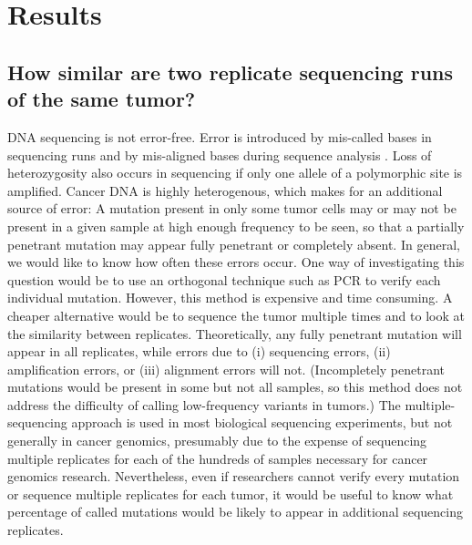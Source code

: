 \documentclass[11pt]{article} %
\begin{document}
\section*{Results}

\subsection*{How similar are two replicate sequencing runs of the same tumor?}

%

DNA sequencing is not error-free. Error is introduced by mis-called bases in sequencing runs and by mis-aligned bases during sequence analysis \citep{seqerror}. Loss of heterozygosity also occurs in sequencing if only one allele of a polymorphic site is amplified. Cancer DNA is highly heterogenous, which makes for an additional source of error: A mutation present in only some tumor cells may or may not be present in a given sample at high enough frequency to be seen, so that a partially penetrant mutation may appear fully penetrant or completely absent. In general, we would like to know how often these errors occur. One way of investigating this question would be to use an orthogonal technique such as PCR to verify each individual mutation. However, this method is expensive and time consuming. A cheaper alternative would be to sequence the tumor multiple times and to look at the similarity between replicates. Theoretically, any fully penetrant mutation will appear in all replicates, while errors due to (i) sequencing errors, (ii) amplification errors, or (iii) alignment errors will not. (Incompletely penetrant mutations would be present in some but not all samples, so this method does not address the difficulty of calling low-frequency variants in tumors.) The multiple-sequencing approach is used in most biological sequencing experiments, but not generally in cancer genomics, presumably due to the expense of sequencing multiple replicates for each of the hundreds of samples necessary for cancer genomics research. Nevertheless, even if researchers cannot verify every mutation or sequence multiple replicates for each tumor, it would be useful to know what percentage of called mutations would be likely to appear in additional sequencing replicates.
\end{document}

